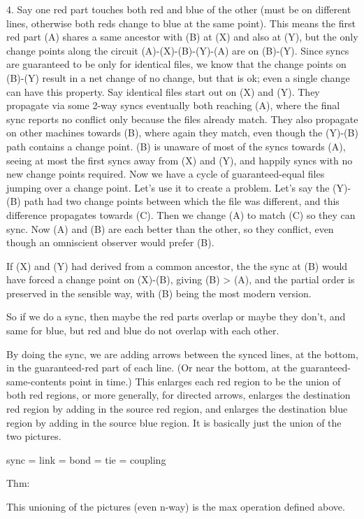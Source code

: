 \documentclass{book}
\begin{document}
4. Say one red part touches both red and blue of the other (must be on different lines, otherwise both reds change to blue at the same point).  This means the first red part (A) shares a same ancestor with (B) at (X) and also at (Y), but the only change points along the circuit (A)-(X)-(B)-(Y)-(A) are on (B)-(Y).  Since syncs are guaranteed to be only for identical files, we know that the change points on (B)-(Y) result in a net change of no change, but that is ok; even a single change can have this property.  Say identical files start out on (X) and (Y).  They propagate via some 2-way syncs eventually both reaching (A), where the final sync reports no conflict only because the files already match.  They also propagate on other machines towards (B), where again they match, even though the (Y)-(B) path contains a change point.  (B) is unaware of most of the syncs towards (A), seeing at most the first syncs away from (X) and (Y), and happily syncs with no new change points required.  Now we have a cycle of guaranteed-equal files jumping over a change point.  Let's use it to create a problem.  Let's say the (Y)-(B) path had two change points between which the file was different, and this difference propagates towards (C).  Then we change (A) to match (C) so they can sync.  Now (A) and (B) are each better than the other, so they conflict, even though an omniscient observer would prefer (B).

If (X) and (Y) had derived from a common ancestor, the the sync at (B) would have forced a change point on (X)-(B), giving (B) > (A), and the partial order is preserved in the sensible way, with (B) being the most modern version.

So if we do a sync, then maybe the red parts overlap or maybe they don't, and same for blue, but red and blue do not overlap with each other.

By doing the sync, we are adding arrows between the synced lines, at the bottom, in the guaranteed-red part of each line.  (Or near the bottom, at the guaranteed-same-contents point in time.)  This enlarges each red region to be the union of both red regions, or more generally, for directed arrows, enlarges the destination red region by adding in the source red region, and enlarges the destination blue region by adding in the source blue region.  It is basically just the union of the two pictures.

sync = link = bond = tie = coupling

Thm:

This unioning of the pictures (even n-way) is the max operation defined above.
\end{document}
